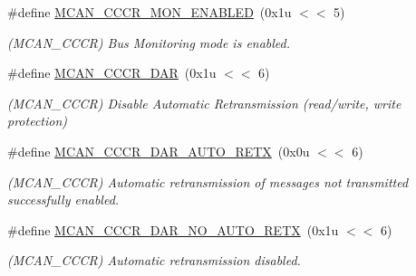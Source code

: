 \begin{DoxyCompactItemize}
\mbox{\label{group__SAME70__MCAN_ga36a9b47ea505af619afa146112b4da3c}} 
\#define \mbox{\hyperlink{group__SAME70__MCAN_ga36a9b47ea505af619afa146112b4da3c}{M\+C\+A\+N\+\_\+\+C\+C\+C\+R\+\_\+\+M\+O\+N\+\_\+\+E\+N\+A\+B\+L\+ED}}~(0x1u $<$$<$ 5)
\begin{DoxyCompactList}\small\item\em (M\+C\+A\+N\+\_\+\+C\+C\+CR) Bus Monitoring mode is enabled. \end{DoxyCompactList}\item 
\mbox{\label{group__SAME70__MCAN_ga3aced5516ff86e195ce6926f518d9e53}} 
\#define \mbox{\hyperlink{group__SAME70__MCAN_ga3aced5516ff86e195ce6926f518d9e53}{M\+C\+A\+N\+\_\+\+C\+C\+C\+R\+\_\+\+D\+AR}}~(0x1u $<$$<$ 6)
\begin{DoxyCompactList}\small\item\em (M\+C\+A\+N\+\_\+\+C\+C\+CR) Disable Automatic Retransmission (read/write, write protection) \end{DoxyCompactList}\item 
\mbox{\label{group__SAME70__MCAN_gae1eb3d856ff903bdbbb8fb924b21d1b9}} 
\#define \mbox{\hyperlink{group__SAME70__MCAN_gae1eb3d856ff903bdbbb8fb924b21d1b9}{M\+C\+A\+N\+\_\+\+C\+C\+C\+R\+\_\+\+D\+A\+R\+\_\+\+A\+U\+T\+O\+\_\+\+R\+E\+TX}}~(0x0u $<$$<$ 6)
\begin{DoxyCompactList}\small\item\em (M\+C\+A\+N\+\_\+\+C\+C\+CR) Automatic retransmission of messages not transmitted successfully enabled. \end{DoxyCompactList}\item 
\mbox{\label{group__SAME70__MCAN_ga6d5b5023117eeabb099c655c532d01af}} 
\#define \mbox{\hyperlink{group__SAME70__MCAN_ga6d5b5023117eeabb099c655c532d01af}{M\+C\+A\+N\+\_\+\+C\+C\+C\+R\+\_\+\+D\+A\+R\+\_\+\+N\+O\+\_\+\+A\+U\+T\+O\+\_\+\+R\+E\+TX}}~(0x1u $<$$<$ 6)
\begin{DoxyCompactList}\small\item\em (M\+C\+A\+N\+\_\+\+C\+C\+CR) Automatic retransmission disabled. \end{DoxyCompactList}\item 
\mbox{\label{group__SAME70__MCAN_ga67951c94eec9d0fade4d5468caa63897}} 

\end{DoxyCompactItemize}

